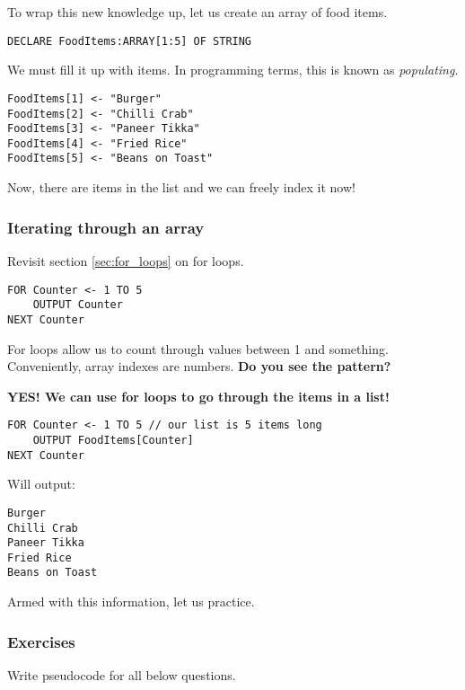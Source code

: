 \documentclass[./main.tex]{subfiles}
\begin{document}
To wrap this new knowledge up, let us create an array of food items.

\begin{verbatim}
DECLARE FoodItems:ARRAY[1:5] OF STRING
\end{verbatim}

We must fill it up with items. In programming terms, this is known as \emph{populating}.

\begin{verbatim}
FoodItems[1] <- "Burger"
FoodItems[2] <- "Chilli Crab"
FoodItems[3] <- "Paneer Tikka"
FoodItems[4] <- "Fried Rice"
FoodItems[5] <- "Beans on Toast"
\end{verbatim}

Now, there are items in the list and we can freely index it now!

\subsubsection{Iterating through an array}

Revisit section \ref{sec:for_loops} on for loops.

\begin{verbatim}
FOR Counter <- 1 TO 5
    OUTPUT Counter
NEXT Counter
\end{verbatim}

For loops allow us to count through values between 1 and something. Conveniently, array indexes are numbers. \textbf{Do you see the pattern?}

\textbf{YES! We can use for loops to go through the items in a list!}

\begin{verbatim}
FOR Counter <- 1 TO 5 // our list is 5 items long
    OUTPUT FoodItems[Counter]
NEXT Counter
\end{verbatim}

Will output:

\begin{verbatim}
Burger
Chilli Crab
Paneer Tikka
Fried Rice
Beans on Toast
\end{verbatim}

Armed with this information, let us practice.

\newpage
\subsubsection{Exercises}
\label{ex:3_2_3}

Write pseudocode for all below questions.
\end{document}

